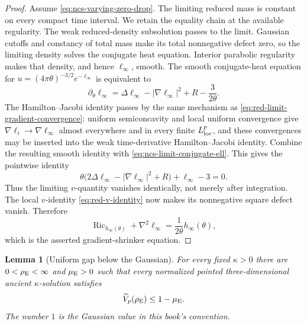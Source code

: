 \documentclass[10pt]{coll-l}
\newtheorem{lemma}[theorem]{Lemma}
\theoremstyle{definition}
\theoremstyle{remark}
\numberwithin{section}{chapter}
\numberwithin{equation}{chapter}
\newcommand{\Ric}{\operatorname{Ric}}
\begin{document}
\begin{proof}
Assume \eqref{eq:ncs-varying-zero-drop}.  The limiting reduced mass is
constant on every compact time interval.  We retain the equality chain at
the available regularity.  The weak reduced-density subsolution passes to
the limit.  Gaussian cutoffs and constancy of total mass make its total
nonnegative defect zero, so the limiting density solves the conjugate heat
equation.  Interior parabolic regularity makes that density, and hence
$\ell_\infty$, smooth.  The smooth conjugate-heat equation for
$u=(4\pi\theta)^{-3/2}e^{-\ell_\infty}$ is equivalent to
\begin{equation}
 \partial_\theta\ell_\infty
   =\Delta\ell_\infty-|\nabla\ell_\infty|^2+R-\frac{3}{2\theta}.
                                                               \label{eq:ncs-limit-conjugate-ell}
\end{equation}
The Hamilton--Jacobi identity passes by the same mechanism as
\eqref{eq:red-limit-gradient-convergence}: uniform semiconcavity and local
uniform convergence give
$\nabla\ell_i\to\nabla\ell_\infty$ almost everywhere and in every finite
$L^p_{\rm loc}$, and these convergences may be inserted into the weak
time-derivative Hamilton--Jacobi identity.  Combine the resulting smooth
identity with \eqref{eq:ncs-limit-conjugate-ell}.  This gives the pointwise
identity
\begin{equation}
 \theta\bigl(2\Delta\ell_\infty-|\nabla\ell_\infty|^2+R\bigr)
                 +\ell_\infty-3=0.                  \label{eq:ncs-limit-v-bracket-zero}
\end{equation}
Thus the limiting $v$-quantity vanishes identically, not merely after
integration.  The local $v$-identity \eqref{eq:red-v-identity} now makes
its nonnegative square defect vanish.  Therefore
\begin{equation}
        \Ric_{h_\infty(\theta)}+\nabla^2\ell_\infty
                  =\frac1{2\theta}h_\infty(\theta),   \label{eq:ncs-limit-shrinker-equation}
\end{equation}
which is the asserted gradient-shrinker equation.
\end{proof}

\begin{lemma}[Uniform gap below the Gaussian]
\label{lem:ncs-Gaussian-gap}
For every fixed $\kappa>0$ there are
$0<\rho_{\rm E}<\infty$ and $\mu_{\rm E}>0$ such that every normalized
pointed three-dimensional ancient $\kappa$-solution satisfies
\begin{equation}
                     \widetilde V_p(\rho_{\rm E})
                          \leq1-\mu_{\rm E}.            \label{eq:ncs-uniform-Gaussian-gap}
\end{equation}
The number $1$ is the Gaussian value in this book's convention.
\end{lemma}
\end{document}
